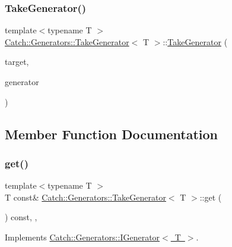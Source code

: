 \subsubsection{\texorpdfstring{Take\+Generator()}{TakeGenerator()}}
{\footnotesize\ttfamily template$<$typename T $>$ \\
\mbox{\hyperlink{class_catch_1_1_generators_1_1_take_generator}{Catch\+::\+Generators\+::\+Take\+Generator}}$<$ T $>$\+::\mbox{\hyperlink{class_catch_1_1_generators_1_1_take_generator}{Take\+Generator}} (\begin{DoxyParamCaption}\item[{size\+\_\+t}]{target,  }\item[{\mbox{\hyperlink{class_catch_1_1_generators_1_1_generator_wrapper}{Generator\+Wrapper}}$<$ T $>$ \&\&}]{generator }\end{DoxyParamCaption})\hspace{0.3cm}{\ttfamily [inline]}}



\subsection{Member Function Documentation}
\mbox{\label{class_catch_1_1_generators_1_1_take_generator_aa4d2560f2066ec2eb4a351d62c107c78}} 
\subsubsection{\texorpdfstring{get()}{get()}}
{\footnotesize\ttfamily template$<$typename T $>$ \\
T const\& \mbox{\hyperlink{class_catch_1_1_generators_1_1_take_generator}{Catch\+::\+Generators\+::\+Take\+Generator}}$<$ T $>$\+::get (\begin{DoxyParamCaption}{ }\end{DoxyParamCaption}) const\hspace{0.3cm}{\ttfamily [inline]}, {\ttfamily [override]}, {\ttfamily [virtual]}}



Implements \mbox{\hyperlink{struct_catch_1_1_generators_1_1_i_generator_a525d381fc9249a885b075a0632a8579a}{Catch\+::\+Generators\+::\+I\+Generator$<$ T $>$}}.

